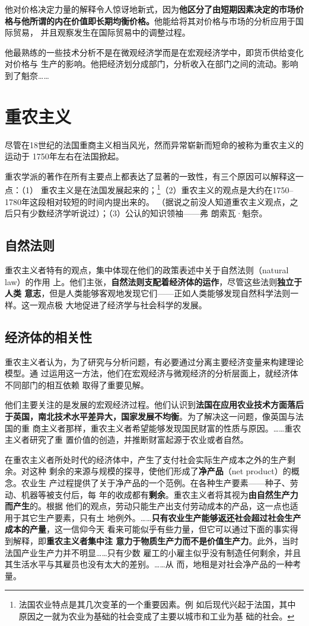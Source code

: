 他对价格决定力量的解释令人惊讶地新式，因为\textbf{他区分了由短期因素决定的市场价
  格与他所谓的内在价值即长期均衡价格。}他能给将其对价格与市场的分析应用于国际贸易，
并且观察发生在国际贸易中的调整过程。

他最熟练的一些技术分析不是在微观经济学而是在宏观经济学中，即货币供给变化对价格与
生产的影响。他把经济划分成部门，分析收入在部门之间的流动。影响到了魁奈……

\section{重农主义}

尽管在18世纪的法国重商主义相当风光，然而异常崭新而短命的被称为重农主义的运动于
1750年左右在法国掀起。

重农学派的著作在所有主要点上都表达了显著的一致性，有三个原因可以解释这一点：（1）
重农主义是在法国发展起来的；\footnote{法国农业特点是其几次变革的一个重要因素。例
  如后现代兴起于法国，其中原因之一就为农业为基础的社会变成了主要以城市和工业为基
  础的社会。}（2）重农主义的观点是大约在1750--1780年这段相对较短的时间内提出来的。
（据说之前没人知道重农主义观点，之后只有少数经济学听说过）；（3）公认的知识领袖——弗
朗索瓦·魁奈。

\subsection{自然法则}

重农主义者特有的观点，集中体现在他们的政策表述中关于自然法则（natural law）的作用
上。他们主张，\textbf{自然法则支配着经济体的运作}，尽管这些法则\textbf{独立于人类
  意志}，但是人类能够客观地发现它们——正如人类能够发现自然科学法则一样。这一观点极
大地促进了经济学与社会科学的发展。

\subsection{经济体的相关性}

重农主义者认为，为了研究与分析问题，有必要通过分离主要经济变量来构建理论模型。通
过运用这一方法，他们在宏观经济与微观经济的分析层面上，就经济体不同部门的相互依赖
取得了重要见解。

他们主要关注的是发展的宏观经济过程。他们认识到\textbf{法国在应用农业技术方面落后
  于英国，南北技术水平差异大，国家发展不均衡}。为了解决这一问题，像英国与法国的重
商主义者那样，重农主义者希望能够发现国民财富的性质与原因。……重农主义者研究了重
置价值的创造，并推断财富起源于农业或者自然。

在重农主义者所处时代的经济体中，产生了支付社会实际生产成本之外的生产剩余。对这种
剩余的来源与规模的探寻，使他们形成了\textbf{净产品}（net product）的概念。农业生
产过程提供了关于净产品的一个范例。在各种生产要素——种子、劳动、机器等被支付后，每
年的收成都有\textbf{剩余}。重农主义者将其视为\textbf{由自然生产力而产生}的。根据
他们的观点，劳动只能生产出支付劳动成本的产品，这一点也适用于其它生产要素，只有土
地例外。……\textbf{只有农业生产能够返还社会超过社会生产成本的产量}，这一信仰今天
看来可能似乎有些力量，但它可以通过下面的事实得到解释，即\textbf{重农主义者集中注
  意力于物质生产力而不是价值生产力}。此外，当时法国产业生产力并不明显……只有少数
雇工的小雇主似乎没有制造任何剩余，并且其生活水平与其雇员也没有太大的差别。……从
而，地租是对社会净产品的一种考量。

